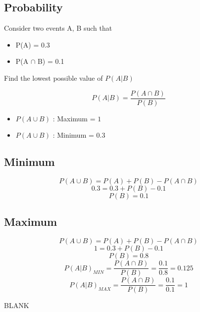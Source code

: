\documentclass[]{report}
\begin{document}
	\large 
	\subsection*{Probability}
	
	Consider two events A, B such that
	
	\begin{itemize}
		\item P(A) = 0.3
		\item P(A $\cap$ B) = 0.1
	\end{itemize}
	Find the lowest possible value of $P(A|B)$
	\begin{framed}
	
	
	\[ P(A|B) = \frac{P(A \cap B) }{P(B)}\]
	
	\end{framed}
	\begin{itemize}
		\item $P(A \cup B)$ : Maximum = $1$
		\item $P(A \cup B)$ : Minimum = $0.3$
	\end{itemize}
	
	\subsection*{Minimum}
	
	\[ P(A \cup B) = P(A) + P(B) - P(A \cap B)\]
	\[ 0.3 = 0.3 + P(B) - 0.1 \]
	\[ P(B) = 0.1\] 
	
	\subsection*{Maximum}
	
	\[ P(A \cup B) = P(A) + P(B) - P(A \cap B)\]
	\[ 1 = 0.3 + P(B) - 0.1 \]
	\[P(B) = 0.8\]
	\bigskip 
	\[ P(A|B)_{MIN} = \frac{P(A \cap B) }{P(B)} = \frac{0.1}{0.8} = 0.125 \]
	\[ P(A|B)_{MAX} = \frac{P(A \cap B) }{P(B)} = \frac{0.1}{0.1} = 1 \]

\newpage 
BLANK	
\end{document}
